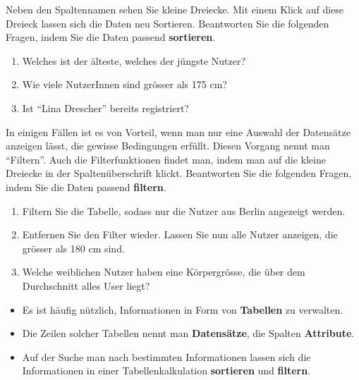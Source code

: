 \begin{myexercise}
    Neben den Spaltennamen sehen Sie kleine Dreiecke. Mit einem Klick auf diese Dreieck lassen sich die Daten neu Sortieren. Beantworten Sie die folgenden Fragen, indem Sie die Daten passend \textbf{sortieren}.

  \begin{enumerate}
      \item Welches ist der älteste, welches der jüngste Nutzer?
      \item Wie viele NutzerInnen sind grösser als 175 cm?
      \item Ist \enquote{Lina Drescher} bereits registriert?
      \setcounter{enumTemp}{\theenumi}
  \end{enumerate}

  In einigen Fällen ist es von Vorteil, wenn man nur eine Auswahl der Datensätze anzeigen lässt, die gewisse Bedingungen erfüllt. Diesen Vorgang nennt man \enquote{Filtern}. Auch die Filterfunktionen findet man, indem man auf die kleine Dreiecke in der Spaltenüberschrift klickt. Beantworten Sie die folgenden Fragen, indem Sie die Daten passend \textbf{filtern}.

  \begin{enumerate}
    \setcounter{enumi}{\theenumTemp}
    \item Filtern Sie die Tabelle, sodass nur die Nutzer aus Berlin angezeigt werden.
    \item Entfernen Sie den Filter wieder. Lassen Sie nun alle Nutzer anzeigen, die grösser als 180 cm sind.
    \item Welche weiblichen Nutzer haben eine Körpergrösse, die über dem Durchschnitt alles User liegt? 
  \end{enumerate}
  
  
\end{myexercise}


\begin{mysummary}

\begin{itemize}
  \item Es ist häufig nützlich, Informationen in Form von \textbf{Tabellen} zu verwalten.
  \item Die Zeilen solcher Tabellen nennt man \textbf{Datensätze}, die Spalten \textbf{Attribute}.
  \item Auf der Suche man nach bestimmten Informationen lassen sich die Informationen in einer Tabellenkalkulation \textbf{sortieren} und \textbf{filtern}.
\end{itemize}
\end{mysummary}


